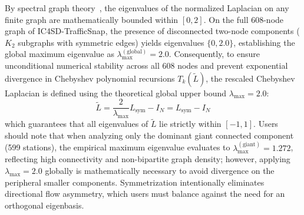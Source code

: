 \documentclass[preprint,12pt]{elsarticle}
\begin{document}
By spectral graph theory~\cite{chung1997spectral}, the eigenvalues of the normalized Laplacian on any finite graph are mathematically bounded within $[0, 2]$. On the full 608-node graph of IC4SD-TrafficSnap, the presence of disconnected two-node components ($K_2$ subgraphs with symmetric edges) yields eigenvalues $\{0, 2.0\}$, establishing the global maximum eigenvalue as $\lambda_{\max}^{(\text{global})} = 2.0$. Consequently, to ensure unconditional numerical stability across all 608 nodes and prevent exponential divergence in Chebyshev polynomial recursions $T_k(\tilde{L})$, the rescaled Chebyshev Laplacian is defined using the theoretical global upper bound $\lambda_{\max} = 2.0$:
\begin{equation}
    \tilde{L} = \frac{2}{\lambda_{\max}} L_{\text{sym}} - I_N = L_{\text{sym}} - I_N
\end{equation}
which guarantees that all eigenvalues of $\tilde{L}$ lie strictly within $[-1, 1]$. Users should note that when analyzing only the dominant giant connected component (599 stations), the empirical maximum eigenvalue evaluates to $\lambda_{\max}^{(\text{giant})} = 1.272$, reflecting high connectivity and non-bipartite graph density; however, applying $\lambda_{\max} = 2.0$ globally is mathematically necessary to avoid divergence on the peripheral smaller components. Symmetrization intentionally eliminates directional flow asymmetry, which users must balance against the need for an orthogonal eigenbasis.

\clearpage
\end{document}
